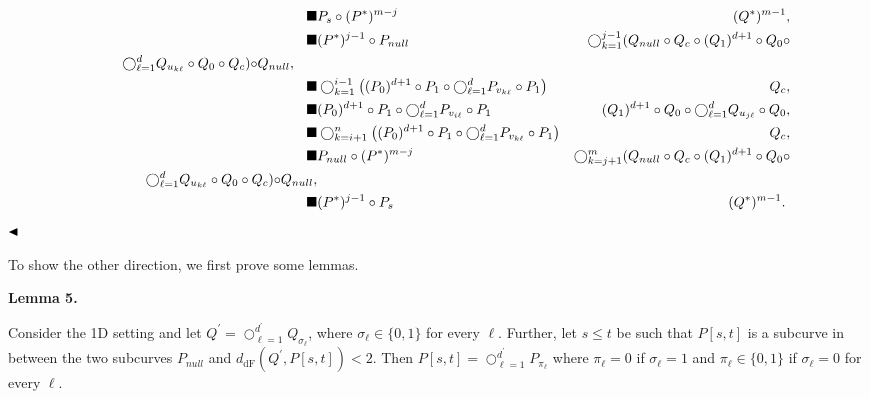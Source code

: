 \documentclass[10pt,a4paper]{article}
\begin{document}
\[\begin{aligned}
\blacksquare & \displaystyle P_{s}\circ(P^{*})^{m-j} & \displaystyle(Q^{*})^{m-1}, \\
\blacksquare & \displaystyle(P^{*})^{j-1}\circ P_{null} & \displaystyle\bigcirc_{k=1}^{j-1}(Q_{null}\circ Q_{c}\circ(Q_{1})^{d+1}\circ Q%
_{0}\circ \\
\displaystyle\nobreak\ \nobreak\ \nobreak\ \nobreak\ \nobreak\ \nobreak\ %
\nobreak\ \nobreak\ \bigcirc_{\ell=1}^{d}Q_{u_{k\ell}}\circ Q_{0}\circ Q_{c}){%
\circ Q_{null}},\nobreak\ \nobreak\ \nobreak\ \nobreak\ \nobreak\  \\
\blacksquare & \displaystyle\bigcirc_{k=1}^{i-1}\left((P_{0})^{d+1}\circ P_{1}\circ\bigcirc_{%
\ell=1}^{d}P_{v_{k\ell}}\circ P_{1}\right) & \displaystyle Q_{c}, \\
\blacksquare & \displaystyle(P_{0})^{d+1}\circ P_{1}\circ\bigcirc_{\ell=1}^{d}P_{v_{i\ell}}%
\circ P_{1} & \displaystyle(Q_{1})^{d+1}\circ Q_{0}\circ\bigcirc_{\ell=1}^{d}Q_{u_{j\ell}}%
\circ Q_{0}, \\
\blacksquare & \displaystyle\bigcirc_{k=i+1}^{n}\left((P_{0})^{d+1}\circ P_{1}\circ\bigcirc_{%
\ell=1}^{d}P_{v_{k\ell}}\circ P_{1}\right) & \displaystyle Q_{c}, \\
\blacksquare & \displaystyle P_{null}\circ(P^{*})^{m-j} & \displaystyle\bigcirc_{k=j+1}^{m}(Q_{null}\circ Q_{c}\circ(Q_{1})^{d+1}\circ Q%
_{0}\circ \\
\displaystyle\nobreak\ \nobreak\ \nobreak\ \nobreak\ \nobreak\ \nobreak\ %
\nobreak\ \nobreak\ \bigcirc_{\ell=1}^{d}Q_{u_{k\ell}}\circ Q_{0}\circ Q_{c}){%
\circ Q_{null}}, \\
\blacksquare & \displaystyle(P^{*})^{j-1}\circ P_{s} & \displaystyle(Q^{*})^{m-1}.\ 
\end{aligned}\]
$\hfill\blacktriangleleft$
\par
\par
To show the other direction, we first prove some lemmas.
\par
\par
\par\medskip\noindent\textbf{Lemma 5.}\par
Consider the 1D setting and let $Q^{\prime}=\bigcirc_{\ell=1}^{d^{\prime}}Q_{\sigma_{\ell}}$, where $\sigma_{\ell}\in\{0,1\}$ for every $\ell$. Further, let $s\leq t$ be such that $P[s,t]$ is a subcurve in between the two subcurves $P_{null}$ and $d_{\text{dF}}(Q^{\prime},P[s,t])<2$. Then $P[s,t]=\bigcirc_{\ell=1}^{d^{\prime}}P_{\pi_{\ell}}$ where $\pi_{\ell}=0$ if $\sigma_{\ell}=1$ and $\pi_{\ell}\in\{0,1\}$ if $\sigma_{\ell}=0$ for every $\ell$.
\end{document}

